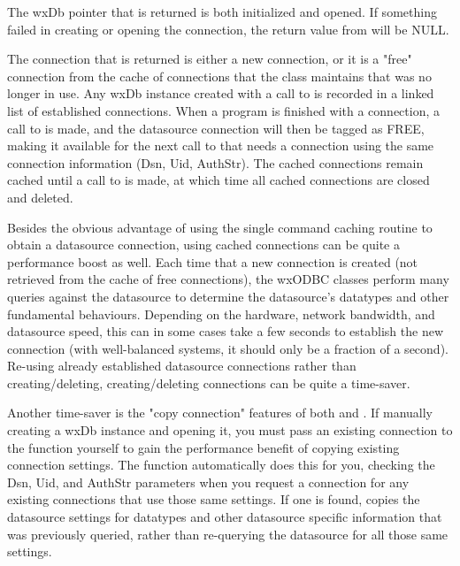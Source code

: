 The wxDb pointer that is returned is both initialized and opened. If 
something failed in creating or opening the connection, the return value 
from  will be NULL.

The connection that is returned is either a new connection, or it is a 
"free" connection from the cache of connections that the class maintains 
that was no longer in use. Any wxDb instance created with a call to 
 is recorded in a linked list of established 
connections. When a program is finished with a connection, a call to 
 is made, and the datasource 
connection will then be tagged as FREE, making it available for the next 
call to  that needs a connection 
using the same connection information (Dsn, Uid, AuthStr). The cached 
connections remain cached until a call to  is made, 
at which time all cached connections are closed and deleted.

Besides the obvious advantage of using the single command caching routine to 
obtain a datasource connection, using cached connections can be quite a 
performance boost as well. Each time that a new connection is created 
(not retrieved from the cache of free connections), the wxODBC classes 
perform many queries against the datasource to determine the datasource's 
datatypes and other fundamental behaviours. Depending on the hardware, 
network bandwidth, and datasource speed, this can in some cases take a 
few seconds to establish the new connection (with well-balanced systems, 
it should only be a fraction of a second). Re-using already established 
datasource connections rather than creating/deleting, creating/deleting 
connections can be quite a time-saver.

Another time-saver is the "copy connection" features of both 
 and . 
If manually creating a wxDb instance and opening it, you must pass an existing 
connection to the  function yourself to gain the performance 
benefit of copying existing connection settings. The 
 function automatically does this 
for you, checking the Dsn, Uid, and AuthStr parameters when you request 
a connection for any existing connections that use those same settings. 
If one is found,  copies the datasource settings for 
datatypes and other datasource specific information that was previously 
queried, rather than re-querying the datasource for all those same settings.

